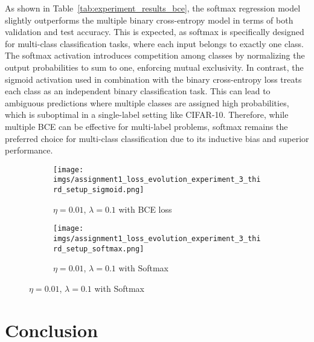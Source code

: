 \documentclass{article}
\begin{document}
As shown in Table~\ref{tab:experiment_results_bce}, the softmax regression model slightly outperforms the multiple binary cross-entropy model in terms of both validation and test accuracy. This is expected, as softmax is specifically designed for multi-class classification tasks, where each input belongs to exactly one class. The softmax activation introduces competition among classes by normalizing the output probabilities to sum to one, enforcing mutual exclusivity. In contrast, the sigmoid activation used in combination with the binary cross-entropy loss treats each class as an independent binary classification task. This can lead to ambiguous predictions where multiple classes are assigned high probabilities, which is suboptimal in a single-label setting like CIFAR-10. Therefore, while multiple BCE can be effective for multi-label problems, softmax remains the preferred choice for multi-class classification due to its inductive bias and superior performance.



\begin{figure}[h!]
    \centering
    \begin{subfigure}{0.45\textwidth}
        \texttt{[image: imgs/assignment1\_loss\_evolution\_experiment\_3\_third\_setup\_sigmoid.png]}
        \caption{$\eta=0.01$, $\lambda=0.1$ with BCE loss}
        \label{fig:exp_bce}
    \end{subfigure}
    \begin{subfigure}{0.45\textwidth}
        \texttt{[image: imgs/assignment1\_loss\_evolution\_experiment\_3\_third\_setup\_softmax.png]}
        \caption{$\eta=0.01$, $\lambda=0.1$ with Softmax}
        \label{fig:exp_softmax}
    \end{subfigure}
\end{figure}


\section{Conclusion}
\end{document}
